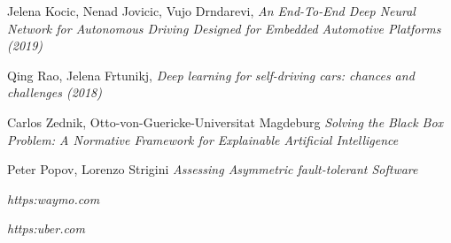 \begin{thebibliography}{9}
Jelena Kocic, Nenad Jovicic, Vujo Drndarevi, \textit{An End-To-End Deep Neural Network for Autonomous Driving Designed for Embedded Automotive Platforms (2019)}

Qing Rao, Jelena Frtunikj, \textit{Deep learning for self-driving cars: chances and challenges (2018)}

Carlos Zednik, Otto-von-Guericke-Universitat Magdeburg \textit{Solving the Black Box Problem: A Normative Framework for Explainable Artificial Intelligence}

Peter Popov, Lorenzo Strigini \textit{Assessing Asymmetric fault-tolerant Software}

\textit{https:\/\/waymo.com\/}

\textit{https:\/\/uber.com\/}

\end{thebibliography}